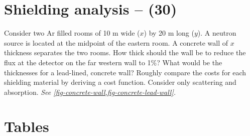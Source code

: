 \documentclass[11pt,a4paper]{article}
\makeatletter
\renewcommand\listoftables{%
    \@starttoc{lot}%
}
\makeatother
\begin{document}
\newpage

\section{Shielding analysis -- (30)}
Consider two Ar filled rooms of 10 m wide ($x$) by 20 m long ($y$). A neutron source is located at the midpoint of the eastern room. A concrete wall of $x$ thickness separates the two rooms. How thick should the wall be to reduce the flux at the detector on the far western wall to 1\%? What would be the thicknesses for a lead-lined, concrete wall? Roughly compare the costs for each shielding material by deriving a cost function. Consider only scattering and absorption. \textit{See \cref{fig-concrete-wall,fig-concrete-lead-wall}.}


\pagestyle{fancyplain}
\fancyhf{} %
\renewcommand{\headrulewidth}{0pt} %
\rfoot{\fancyplain{}{\thepage}}
\nolinenumbers


%
%

\setlength{\bibhang}{0pt}

%


\newpage 


\section*{Tables}

{%
\let\oldnumberline\numberline%
\renewcommand{\numberline}{\tablename~\oldnumberline}%
\listoftables%
}


\newpage
\end{document}
